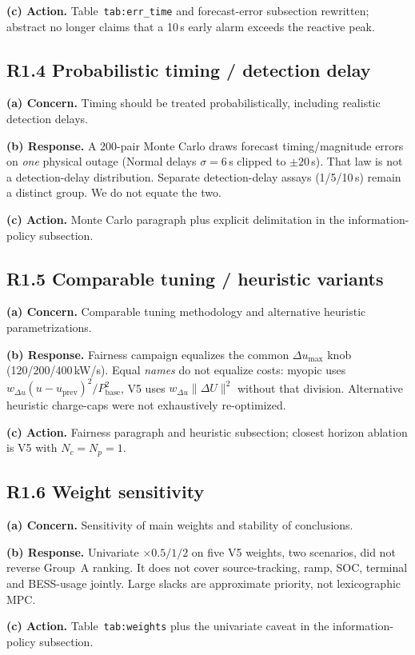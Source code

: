 \documentclass[11pt]{article}
\begin{document}
\textbf{(c) Action.} Table~\texttt{tab:err\_time} and forecast-error subsection rewritten; abstract no longer claims that a 10\,s early alarm exceeds the reactive peak.

\subsection*{R1.4 Probabilistic timing / detection delay}
\textbf{(a) Concern.} Timing should be treated probabilistically, including realistic detection delays.

\textbf{(b) Response.} A 200-pair Monte Carlo draws forecast timing/magnitude errors on \emph{one} physical outage (Normal delays $\sigma=6$\,s clipped to $\pm 20$\,s). That law is not a detection-delay distribution. Separate detection-delay assays (1/5/10\,s) remain a distinct group. We do not equate the two.

\textbf{(c) Action.} Monte Carlo paragraph plus explicit delimitation in the information-policy subsection.

\subsection*{R1.5 Comparable tuning / heuristic variants}
\textbf{(a) Concern.} Comparable tuning methodology and alternative heuristic parametrizations.

\textbf{(b) Response.} Fairness campaign equalizes the common $\Delta u_{\max}$ knob (120/200/400\,kW/s). Equal \emph{names} do not equalize costs: myopic uses $w_{\Delta u}(u-u_{\mathrm{prev}})^2/P_{\mathrm{base}}^2$, V5 uses $w_{\Delta u}\|\Delta U\|^2$ without that division. Alternative heuristic charge-caps were not exhaustively re-optimized.

\textbf{(c) Action.} Fairness paragraph and heuristic subsection; closest horizon ablation is V5 with $N_c=N_p=1$.

\subsection*{R1.6 Weight sensitivity}
\textbf{(a) Concern.} Sensitivity of main weights and stability of conclusions.

\textbf{(b) Response.} Univariate $\times 0.5/1/2$ on five V5 weights, two scenarios, did not reverse Group~A ranking. It does not cover source-tracking, ramp, SOC, terminal and BESS-usage jointly. Large slacks are approximate priority, not lexicographic MPC.

\textbf{(c) Action.} Table~\texttt{tab:weights} plus the univariate caveat in the information-policy subsection.
\end{document}
